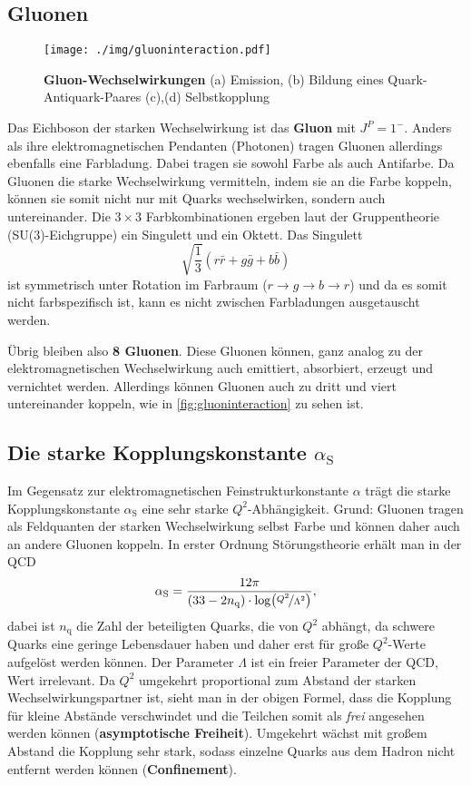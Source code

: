 \subsection{Gluonen}
\begin{figure}
	\centering
	\texttt{[image: ./img/gluoninteraction.pdf]}
	\caption[Gluon-Wechselwirkungen]{\textbf{Gluon-Wechselwirkungen} (a) Emission, (b) Bildung eines Quark-Antiquark-Paares (c),(d) Selbstkopplung}
	\label{fig:gluoninteraction}
\end{figure}
Das Eichboson der starken Wechselwirkung ist das \textbf{Gluon} mit $J^P=1^-$.
Anders als ihre elektromagnetischen Pendanten (Photonen) tragen Gluonen allerdings ebenfalls eine Farbladung.
Dabei tragen sie sowohl Farbe als auch Antifarbe.
Da Gluonen die starke Wechselwirkung vermitteln, indem sie an die Farbe koppeln, können sie somit nicht nur mit Quarks wechselwirken, sondern auch untereinander.
Die $3\times 3$ Farbkombinationen ergeben laut der Gruppentheorie (SU(3)-Eichgruppe) ein Singulett und ein Oktett.
Das Singulett
\begin{equation*}
	\sqrt{\frac{1}{3}}\left(r\bar{r}+g\bar{g}+b\bar{b}\right)
\end{equation*}
ist symmetrisch unter Rotation im Farbraum ($r\rightarrow g\rightarrow b \rightarrow r$) und da es somit nicht farbspezifisch ist, kann es nicht zwischen Farbladungen ausgetauscht werden.

Übrig bleiben also \textbf{8 Gluonen}.
Diese Gluonen können, ganz analog zu der elektromagnetischen Wechselwirkung auch emittiert, absorbiert, erzeugt und vernichtet werden.
Allerdings können Gluonen auch zu dritt und viert untereinander koppeln, wie in \autoref{fig:gluoninteraction} zu sehen ist.

\subsection{Die starke Kopplungskonstante $\alpha_\text{S}$}
Im Gegensatz zur elektromagnetischen Feinstrukturkonstante $\alpha$ trägt die starke Kopplungskonstante $\alpha_\text{S}$ eine sehr starke $Q^2$-Abhängigkeit.
Grund: Gluonen tragen als Feldquanten der starken Wechselwirkung selbst Farbe und können daher auch an andere Gluonen koppeln.
In erster Ordnung Störungstheorie erhält man in der QCD
\begin{equation*}
	\alpha_\text{S}=\frac{12\pi}{(33-2n_\text{q})\cdot\log(\nicefrac{Q^2}{\Lambda^2})},
\end{equation*}
dabei ist $n_\text{q}$ die Zahl der beteiligten Quarks, die von $Q^2$ abhängt, da schwere Quarks eine geringe Lebensdauer haben und daher erst für große $Q^2$-Werte aufgelöst werden können.
Der Parameter $\Lambda$ ist ein freier Parameter der QCD, Wert irrelevant.
Da $Q^2$ umgekehrt proportional zum Abstand der starken Wechselwirkungspartner ist, sieht man in der obigen Formel, dass die Kopplung für kleine Abstände verschwindet und die Teilchen somit als \textit{frei} angesehen werden können (\textbf{asymptotische Freiheit}).
Umgekehrt wächst mit großem Abstand die Kopplung sehr stark, sodass einzelne Quarks aus dem Hadron nicht entfernt werden können (\textbf{Confinement}).
